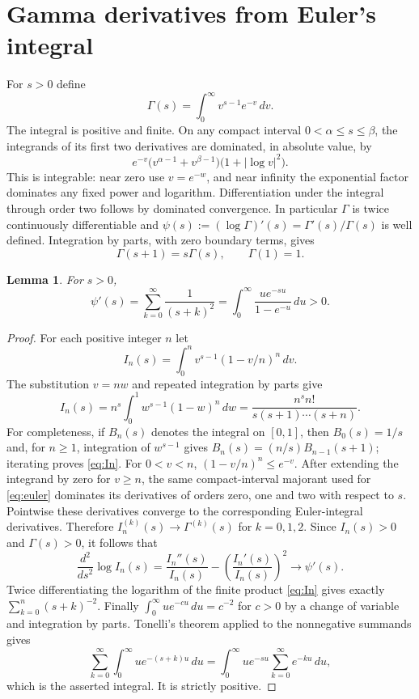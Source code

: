 \documentclass[11pt]{article}
\newtheorem{lemma}[theorem]{Lemma}
\begin{document}
\section{Gamma derivatives from Euler's integral}\label{sec:derivatives}
For $s>0$ define
\begin{equation}\label{eq:euler}
\Gamma(s)=\int_0^\infty v^{s-1}e^{-v}\,dv.
\end{equation}
The integral is positive and finite. On any compact interval
$0<\alpha\le s\le\beta$, the integrands of its first two derivatives
are dominated, in absolute value, by
\[
e^{-v}\bigl(v^{\alpha-1}+v^{\beta-1}\bigr)
\bigl(1+|\log v|^2\bigr).
\]
This is integrable: near zero use $v=e^{-w}$, and near infinity the
exponential factor dominates any fixed power and logarithm.
Differentiation under the integral through order two follows by
dominated convergence. In particular $\Gamma$ is twice continuously
differentiable and
$\psi(s):=(\log\Gamma)'(s)=\Gamma'(s)/\Gamma(s)$ is well defined.
Integration by parts, with zero boundary terms, gives
\begin{equation}\label{eq:recurrence}
\Gamma(s+1)=s\Gamma(s),\qquad \Gamma(1)=1.
\end{equation}

\begin{lemma}\label{lem:trigamma}
For $s>0$,
\begin{equation}\label{eq:trigamma}
\psi'(s)=\sum_{k=0}^\infty\frac1{(s+k)^2}
=\int_0^\infty\frac{u e^{-su}}{1-e^{-u}}\,du>0.
\end{equation}
\end{lemma}
\begin{proof}
For each positive integer $n$ let
\[
I_n(s)=\int_0^n v^{s-1}(1-v/n)^n\,dv.
\]
The substitution $v=nw$ and repeated integration by parts give
\begin{equation}\label{eq:In}
I_n(s)=n^s\int_0^1 w^{s-1}(1-w)^n\,dw
=\frac{n^s n!}{s(s+1)\cdots(s+n)}.
\end{equation}
For completeness, if $B_n(s)$ denotes the integral on $[0,1]$, then
$B_0(s)=1/s$ and, for $n\ge1$, integration of $w^{s-1}$ gives
$B_n(s)=(n/s)B_{n-1}(s+1)$; iterating proves \eqref{eq:In}.
For $0<v<n$, $(1-v/n)^n\le e^{-v}$. After extending the integrand
by zero for $v\ge n$, the same compact-interval majorant used for
\eqref{eq:euler} dominates its derivatives of orders zero, one and two
with respect to $s$. Pointwise these derivatives converge to the
corresponding Euler-integral derivatives. Therefore
$I_n^{(k)}(s)\to\Gamma^{(k)}(s)$ for $k=0,1,2$.
Since $I_n(s)>0$ and $\Gamma(s)>0$, it follows that
\[
\frac{d^2}{ds^2}\log I_n(s)
=\frac{I_n''(s)}{I_n(s)}-
\left(\frac{I_n'(s)}{I_n(s)}\right)^2
\longrightarrow\psi'(s).
\]
Twice differentiating the logarithm of the finite product
\eqref{eq:In} gives exactly $\sum_{k=0}^n(s+k)^{-2}$.
Finally $\int_0^\infty u e^{-cu}\,du=c^{-2}$ for $c>0$ by a change
of variable and integration by parts. Tonelli's theorem applied to
the nonnegative summands gives
\[
\sum_{k=0}^\infty\int_0^\infty u e^{-(s+k)u}\,du
=\int_0^\infty u e^{-su}\sum_{k=0}^\infty e^{-ku}\,du,
\]
which is the asserted integral. It is strictly positive.
\end{proof}
\end{document}
